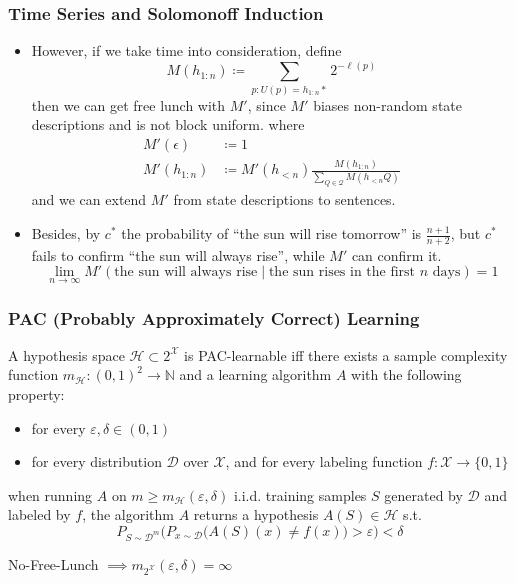 \documentclass[UTF8,11pt,colorlinks,compress,openany]{beamer}%
\begin{document}
\begin{frame}\frametitle{Time Series and Solomonoff Induction}
	\begin{itemize}
		\item However, if we take time into consideration, define
		\[M(h_{1:n})\coloneqq \sum\limits_{p:U(p)=h_{1:n}*}2^{-\ell(p)}\]
		then we can get free lunch with $M'$, since $M'$ biases non-random state descriptions and is not block uniform.
		where 
		\begin{align*}
		M'(\epsilon)&\coloneqq 1\\
		M'(h_{1:n})&\coloneqq M'(h_{<n})\frac{M(h_{1:n})}{\sum\limits_{Q\in\mathcal{Q}}M(h_{<n}Q)}
		\end{align*}
		and we can extend $M'$ from state descriptions to sentences.
		\item Besides, by $c^*$ the probability of ``the sun will rise tomorrow'' is $\frac{n+1}{n+2}$, but $c^*$ fails to confirm ``the sun will always rise'', while $M'$ can confirm it.
		\[\lim\limits_{n\to\infty}M'(\text{the sun will always rise}\mid\text{the sun rises in the first $n$ days})=1\]
	\end{itemize}
\end{frame}

\begin{frame}\frametitle{PAC (Probably Approximately Correct) Learning}
\setlength\abovedisplayskip{0pt}
\setlength\belowdisplayskip{0pt}
	\begin{definition}
		A hypothesis space $\mathcal{H}\subset 2^{\mathcal{X}}$ is PAC-learnable iff there exists a sample complexity function $m_{\mathcal{H}}: (0,1)^2\to\mathbb{N}$ and a learning algorithm $A$ with the following property:
		\begin{itemize}
			\item for every $\varepsilon,\delta\in(0,1)$
			\item for every distribution $\mathcal{D}$ over $\mathcal{X}$, and for every labeling function $f:\mathcal{X}\to\{0,1\}$
		\end{itemize}
		when running $A$ on $m\geq m_{\mathcal{H}}(\varepsilon,\delta)$ i.i.d. training samples $S$ generated by $\mathcal{D}$ and labeled by $f$, the algorithm $A$ returns a hypothesis $A(S)\in\mathcal{H}$ s.t.
		\[P_{S\sim\mathcal{D}^m}\Big(P_{x\sim\mathcal{D}}\big(A(S)(x)\neq f(x)\big)>\varepsilon\Big)<\delta\]
	\end{definition}
	\centering No-Free-Lunch $\implies m_{2^{\mathcal{X}}}(\varepsilon,\delta)=\infty$
\end{frame}
\end{document}
